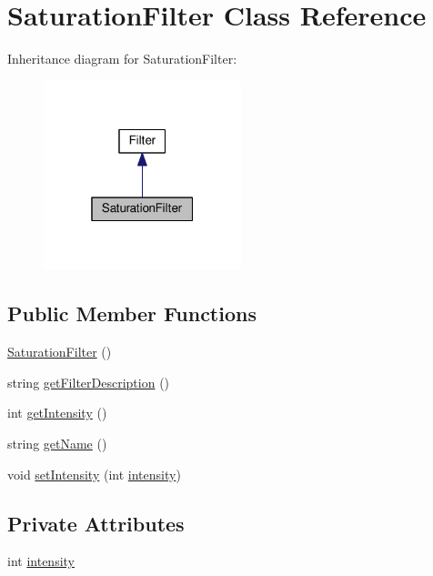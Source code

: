 \hypertarget{classModel_1_1SaturationFilter}{}\section{Saturation\+Filter Class Reference}
\label{classModel_1_1SaturationFilter}


Inheritance diagram for Saturation\+Filter\+:
\nopagebreak
\begin{figure}[H]
\begin{center}
\leavevmode
\includegraphics[width=163pt]{classModel_1_1SaturationFilter__inherit__graph}
\end{center}
\end{figure}
\subsection*{Public Member Functions}
\begin{DoxyCompactItemize}
\item 
\hyperlink{classModel_1_1SaturationFilter_ae45fd836bb8ade0550727f4060bdffa9}{Saturation\+Filter} ()
\item 
string \hyperlink{classModel_1_1SaturationFilter_a62b7b60e24f92234393b840b35808e06}{get\+Filter\+Description} ()
\item 
int \hyperlink{classModel_1_1SaturationFilter_a708995fb1b6acb31ee0dfb0f4881e5b5}{get\+Intensity} ()
\item 
string \hyperlink{classModel_1_1SaturationFilter_a11335e13e50af74108bf926dc1340b4b}{get\+Name} ()
\item 
void \hyperlink{classModel_1_1SaturationFilter_ac8255ffbc46bb61acaa8fd23d0d260eb}{set\+Intensity} (int \hyperlink{classModel_1_1SaturationFilter_a299ec0c42ccc5a2d79d1739428ac3210}{intensity})
\end{DoxyCompactItemize}
\subsection*{Private Attributes}
\begin{DoxyCompactItemize}
\item 
int \hyperlink{classModel_1_1SaturationFilter_a299ec0c42ccc5a2d79d1739428ac3210}{intensity}
\end{DoxyCompactItemize}
